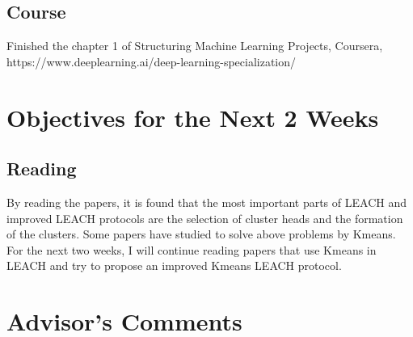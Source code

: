 \documentclass[11pt]{report}
\begin{document}
	
	\subsection{Course}
	Finished the chapter 1 of Structuring Machine Learning Projects, Coursera, https://www.deeplearning.ai/deep-learning-specialization/
	
	\section{Objectives for the Next 2 Weeks}
	\subsection{Reading} 
	By reading the papers, it is found that the most important parts of LEACH and improved LEACH protocols are the selection of cluster heads and the formation of the clusters. Some papers have studied to solve above problems by Kmeans. For the next two weeks, I will continue reading papers that use Kmeans in LEACH and try to propose an improved Kmeans LEACH protocol. 
	
	\section{Advisor's Comments}
	
	
	
	
\end{document}
